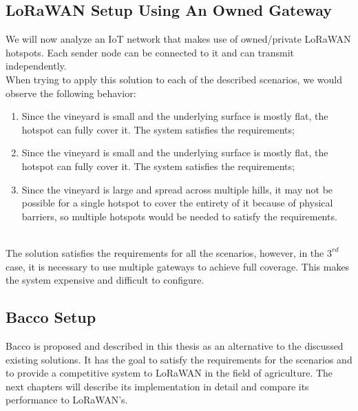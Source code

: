\subsection{LoRaWAN Setup Using An Owned Gateway}
We will now analyze an \gls{IoT} network that makes use of owned/private LoRaWAN hotspots. Each
sender node can be connected to it and can transmit independently.\\
When trying to apply this solution to each of the described scenarios, we would observe the following behavior:
\begin{enumerate}
    \item Since the vineyard is small and the underlying surface is mostly flat, the hotspot can fully cover it. The
        system satisfies the requirements;
    \item Since the vineyard is small and the underlying surface is mostly flat, the hotspot can fully cover it. The
        system satisfies the requirements;
    \item Since the vineyard is large and spread across multiple hills, it may not be possible for a single hotspot to
        cover the entirety of it because of physical barriers, so multiple hotspots would be needed to satisfy the
        requirements.
\end{enumerate}
\\
The solution satisfies the requirements for all the scenarios, however, in the $3^{rd}$ case, it is necessary to use
multiple gateways to achieve full coverage. This makes the system expensive and difficult to configure.

\subsection{Bacco Setup}
Bacco is proposed and described in this thesis as an alternative to the discussed existing solutions. It has the goal to
satisfy the requirements for the scenarios and to provide a competitive system to LoRaWAN in the field of
agriculture. The next chapters will describe its implementation in detail and compare its performance to LoRaWAN's.
